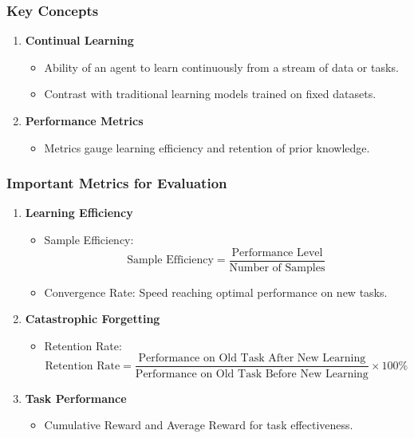 \documentclass[aspectratio=169]{beamer}
\begin{document}
\begin{frame}[fragile]
    \frametitle{Key Concepts}
    \begin{enumerate}
        \item \textbf{Continual Learning}
            \begin{itemize}
                \item Ability of an agent to learn continuously from a stream of data or tasks.
                \item Contrast with traditional learning models trained on fixed datasets.
            \end{itemize}
        \item \textbf{Performance Metrics}
            \begin{itemize}
                \item Metrics gauge learning efficiency and retention of prior knowledge.
            \end{itemize}
    \end{enumerate}
\end{frame}

\begin{frame}[fragile]
    \frametitle{Important Metrics for Evaluation}
    \begin{enumerate}
        \item \textbf{Learning Efficiency}
            \begin{itemize}
                \item Sample Efficiency: 
                \[
                \text{Sample Efficiency} = \frac{\text{Performance Level}}{\text{Number of Samples}}
                \]
                \item Convergence Rate: Speed reaching optimal performance on new tasks.
            \end{itemize}
        \item \textbf{Catastrophic Forgetting}
            \begin{itemize}
                \item Retention Rate: 
                \[
                \text{Retention Rate} = \frac{\text{Performance on Old Task After New Learning}}{\text{Performance on Old Task Before New Learning}} \times 100\%
                \]
            \end{itemize}
        \item \textbf{Task Performance}
            \begin{itemize}
                \item Cumulative Reward and Average Reward for task effectiveness.
            \end{itemize}
    \end{enumerate}
\end{frame}
\end{document}
